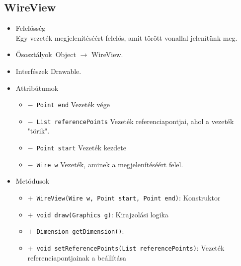 \subsection{WireView}
\begin{itemize}
\item Felelősség\\
Egy vezeték megjelenítéséért felelős, amit törött vonallal jelenítünk meg.
\item Ősosztályok\ Object $\rightarrow{}$ WireView.
\item Interfészek Drawable.
\item Attribútumok $\ $
\begin{itemize}
	\item[] \texttt{$-$ Point end} Vezeték vége
	\item[] \texttt{$-$ List referencePoints} Vezeték referenciapontjai, ahol a vezeték "törik".
	\item[] \texttt{$-$ Point start} Vezeték kezdete
	\item[] \texttt{$-$ Wire w} Vezeték, aminek a megjelenítéséért felel.
\end{itemize}
\item Metódusok$\ $
\begin{itemize}
	\item[] \texttt{$+$ WireView(Wire w, Point start, Point end)}: Konstruktor
	\item[] \texttt{$+$ void draw(Graphics g)}: Kirajzolási logika
	\item[] \texttt{$+$ Dimension getDimension()}: 
	\item[] \texttt{$+$ void setReferencePoints(List referencePoints)}: Vezeték referenciapontjainak a beállítása
\end{itemize}
\end{itemize}

